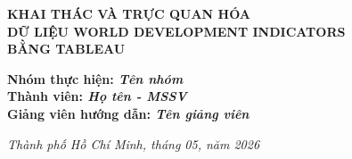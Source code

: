 \begin{titlepage}
\begin{center}
{\fontsize{18}{22}\selectfont\bfseries\color{navyblue}
KHAI THÁC VÀ TRỰC QUAN HÓA\\[0.25cm]
DỮ LIỆU WORLD DEVELOPMENT INDICATORS\\[0.25cm]
BẰNG TABLEAU}

\end{center}

\vspace*{\fill}

\begin{flushleft}
\hspace{2.5cm}
{\fontsize{12}{16}\selectfont\bfseries\color{navyblue}
Nhóm thực hiện: \textit{Tên nhóm}}\\[0.2cm]
\hspace{2.5cm}
{\fontsize{12}{16}\selectfont\bfseries\color{navyblue}
Thành viên: \textit{Họ tên - MSSV}}\\[0.2cm]
\hspace{2.5cm}
{\fontsize{12}{16}\selectfont\bfseries\color{navyblue}
Giảng viên hướng dẫn: \textit{Tên giảng viên}}
\end{flushleft}

\vspace{0.8cm}

\begin{center}
{\fontsize{11}{13}\selectfont\itshape\color{navyblue}
Thành phố Hồ Chí Minh, tháng 05, năm 2026}
\end{center}

\vspace{0.4cm}

\end{titlepage}
